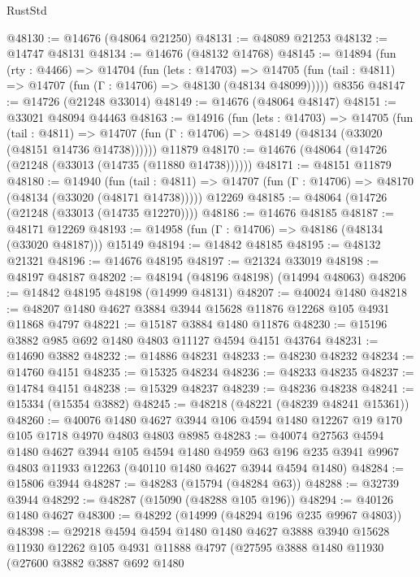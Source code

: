 \begin{lexlean}{RustStd}
\begin{coremodule}
@48130 := @14676 (@48064 @21250)
@48131 := @48089 @21253
@48132 := @14747 @48131
@48134 := @14676 (@48132 @14768)
@48145 := @14894
    (fun (rty : @4466) =>
    @14704
      (fun (lets : @14703) =>
      @14705 (fun (tail : @4811) => @14707 (fun (Γ : @14706) => @48130 (@48134 @48099)))))
    @8356
@48147 := @14726 (@21248 @33014)
@48149 := @14676 (@48064 @48147)
@48151 := @33021 @48094 @44463
@48163 := @14916
    (fun (lets : @14703) =>
    @14705
      (fun (tail : @4811) =>
      @14707 (fun (Γ : @14706) => @48149 (@48134 (@33020 (@48151 @14736 @14738))))))
    @11879
@48170 := @14676 (@48064 (@14726 (@21248 (@33013 (@14735 (@11880 @14738))))))
@48171 := @48151 @11879
@48180 := @14940
    (fun (tail : @4811) => @14707 (fun (Γ : @14706) => @48170 (@48134 (@33020 (@48171 @14738)))))
    @12269
@48185 := @48064 (@14726 (@21248 (@33013 (@14735 @12270))))
@48186 := @14676 @48185
@48187 := @48171 @12269
@48193 := @14958 (fun (Γ : @14706) => @48186 (@48134 (@33020 @48187))) @15149
@48194 := @14842 @48185
@48195 := @48132 @21321
@48196 := @14676 @48195
@48197 := @21324 @33019
@48198 := @48197 @48187
@48202 := @48194 (@48196 @48198) (@14994 @48063)
@48206 := @14842 @48195 @48198 (@14999 @48131)
@48207 := @40024 @1480
@48218 := @48207 @1480 @4627 @3884 @3944 @15628 @11876 @12268 @105 @4931 @11868 @4797
@48221 := @15187 @3884 @1480 @11876
@48230 := @15196 @3882 @985 @692 @1480 @4803 @11127 @4594 @4151 @43764
@48231 := @14690 @3882
@48232 := @14886 @48231
@48233 := @48230 @48232
@48234 := @14760 @4151
@48235 := @15325 @48234
@48236 := @48233 @48235
@48237 := @14784 @4151
@48238 := @15329 @48237
@48239 := @48236 @48238
@48241 := @15334 (@15354 @3882)
@48245 := @48218 (@48221 (@48239 @48241 @15361))
@48260 := @40076
    @1480
    @4627
    @3944
    @106
    @4594
    @1480
    @12267
    @19
    @170
    @105
    @1718
    @4970
    @4803
    @4803
    @8985
@48283 := @40074
    @27563
    @4594
    @1480
    @4627
    @3944
    @105
    @4594
    @1480
    @4959
    @63
    @196
    @235
    @3941
    @9967
    @4803
    @11933
    @12263
    (@40110 @1480 @4627 @3944 @4594 @1480)
@48284 := @15806 @3944
@48287 := @48283 (@15794 (@48284 @63))
@48288 := @32739 @3944
@48292 := @48287 (@15090 (@48288 @105 @196))
@48294 := @40126 @1480 @4627
@48300 := @48292 (@14999 (@48294 @196 @235 @9967 @4803))
@48398 := @29218
    @4594
    @4594
    @1480
    @1480
    @4627
    @3888
    @3940
    @15628
    @11930
    @12262
    @105
    @4931
    @11888
    @4797
    (@27595
      @3888
      @1480
      @11930
      (@27600
        @3882
        @3887
        @692
        @1480

\end{coremodule}
\end{lexlean}

